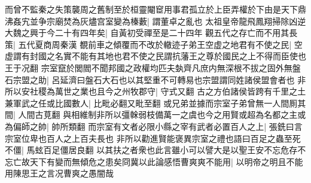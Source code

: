 而曾不監秦之失策襲周之舊制至於桓靈閹䆠用事君孤立於上臣弄權於下由是天下鼎沸姦宄並争宗廟焚為灰燼宫室變為榛藪|{
	謂董卓之亂也}
太祖皇帝龍飛鳳翔掃除凶逆大魏之興于今二十有四年矣|{
	自黃初受禪至是二十四年}
觀五代之存亡而不用其長策|{
	五代夏商周秦漢}
覩前車之傾覆而不改於轍迹子弟王空虚之地君有不使之民|{
	空虚謂有封國之名實不能有其地也君不使之民謂抗藩王之尊於國民之上不得而臣使也王于况翻}
宗室竄於閭閻不聞邦國之政權均匹夫埶齊凡庶内無深根不拔之固外無盤石宗盟之助|{
	呂延濟曰盤石大石也以其堅重不可轉易也宗盟謂同姓諸侯盟會者也}
非所以安社稷為萬世之業也且今之州牧郡守|{
	守式又翻}
古之方伯諸侯皆跨有千里之土兼軍武之任或比國數人|{
	比毗必翻又毗至翻}
或兄弟並據而宗室子弟曾無一人間厠其間|{
	人間古莧翻}
與相維制非所以彊榦弱枝備萬一之虞也今之用賢或超為名都之主或為偏師之帥|{
	帥所類翻}
而宗室有文者必限小縣之宰有武者必置百人之上|{
	張銑曰言宗室位卑也百人之上百夫長也}
非所以勸進賢能褒異宗室之禮也語曰百足之蟲至死不僵|{
	馬蚿百足僵居良翻}
以其扶之者衆也此言雖小可以譬大是以聖王安不忘危存不忘亡故天下有變而無傾危之患矣冏冀以此論感悟曹爽爽不能用|{
	以明帝之明且不能用陳思王之言况曹爽之愚闇哉}


